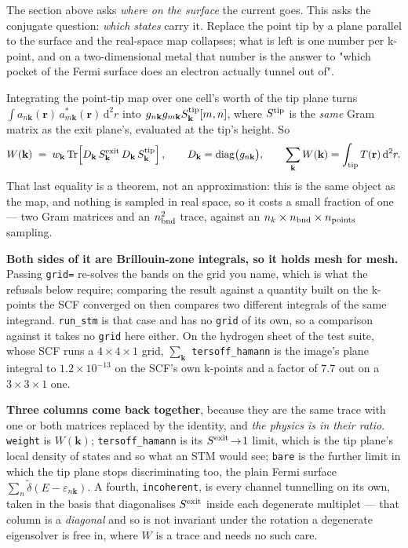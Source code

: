 \documentclass[11pt,a4paper]{article}
\newcommand{\code}[1]{\texttt{\small #1}}
\begin{document}
The section above asks \emph{where on the surface} the current goes. This asks
the conjugate question: \emph{which states} carry it. Replace the point tip by a
plane parallel to the surface and the real-space map collapses; what is left is
one number per k-point, and on a two-dimensional metal that number is the
answer to "which pocket of the Fermi surface does an electron actually tunnel
out of".

Integrating the point-tip map over one cell's worth of the tip plane turns
$\int a_{n\mathbf k}(\mathbf r)\, a^{*}_{m\mathbf k}(\mathbf r)\,\mathrm d^2 r$
into $g_{n\mathbf k} g_{m\mathbf k} S^{\rm tip}_{\mathbf k}[m,n]$, where
$S^{\rm tip}$ is the \emph{same} Gram matrix as the exit plane's, evaluated at
the tip's height. So
\begin{equation*}
  W(\mathbf k) \;=\; w_{\mathbf k}\,
    \mathrm{Tr}\!\left[ D_{\mathbf k}\, S^{\rm exit}_{\mathbf k}\,
                        D_{\mathbf k}\, S^{\rm tip}_{\mathbf k} \right],
  \qquad D_{\mathbf k} = \mathrm{diag}\bigl(g_{n\mathbf k}\bigr),
  \qquad \sum_{\mathbf k} W(\mathbf k) = \int_{\rm tip} T(\mathbf r)\,\mathrm d^2 r .
\end{equation*}
That last equality is a theorem, not an approximation: this is the same object
as the map, and nothing is sampled in real space, so it costs a small fraction
of one --- two Gram matrices and an $n_{\rm bnd}^2$ trace, against an
$n_k \times n_{\rm bnd} \times n_{\rm points}$ sampling.

\textbf{Both sides of it are Brillouin-zone integrals, so it holds mesh for
mesh.} Passing \code{grid=} re-solves the bands on the grid you name, which is
what the refusals below require; comparing the result against a quantity built
on the k-points the SCF converged on then compares two different integrals of
the same integrand. \code{run\_stm} is that case and has no \code{grid} of its
own, so a comparison against it takes no \code{grid} here either. On the
hydrogen sheet of the test suite, whose SCF runs a $4\times4\times1$ grid,
$\sum_{\mathbf k}$ \code{tersoff\_hamann} is the image's plane integral to
$1.2\times10^{-13}$ on the SCF's own k-points and a factor of $7.7$ out on a
$3\times3\times1$ one.

\textbf{Three columns come back together}, because they are the same trace with
one or both matrices replaced by the identity, and \emph{the physics is in their
ratio}. \code{weight} is $W(\mathbf k)$; \code{tersoff\_hamann} is its
$S^{\rm exit}\!\to\!1$ limit, which is the tip plane's local density of states
and so what an STM would see; \code{bare} is the further limit in which the tip
plane stops discriminating too, the plain Fermi surface
$\sum_n \tilde\delta(E - \varepsilon_{n\mathbf k})$. A fourth,
\code{incoherent}, is every channel tunnelling on its own, taken in the basis
that diagonalises $S^{\rm exit}$ inside each degenerate multiplet --- that
column is a \emph{diagonal} and so is not invariant under the rotation a
degenerate eigensolver is free in, where $W$ is a trace and needs no such care.
\end{document}
